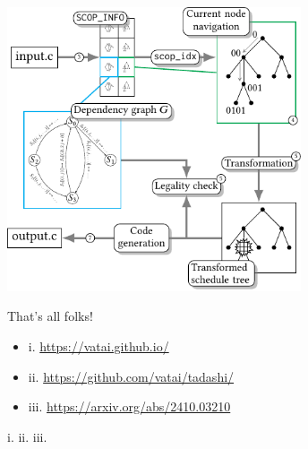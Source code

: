 \documentclass[presentation, aspectratio=169]{beamer}
\begin{document}
\begin{frame}[label={sec:orgd7ceb63}]{}
\begin{center}
\includegraphics[width=0.65\textwidth]{./figs/design.pdf}
\end{center}
\end{frame}
\begin{frame}[label={sec:orga0da6b6}]{That's all folks!}
\begin{itemize}
\item i. \url{https://vatai.github.io/}
\item ii. \url{https://github.com/vatai/tadashi/}
\item iii. \url{https://arxiv.org/abs/2410.03210}
\end{itemize}

\bigskip

i.  \hfill
ii.  \hfill
iii. 
\end{frame}
\end{document}
